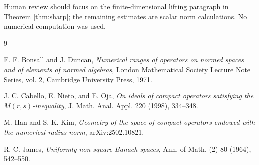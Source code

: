 \documentclass[11pt]{article}
\begin{document}
Human review should focus on the finite-dimensional lifting paragraph in
Theorem \ref{thm:sharp}; the remaining estimates are scalar norm calculations.
No numerical computation was used.

\begin{thebibliography}{9}

F. F. Bonsall and J. Duncan,
\emph{Numerical ranges of operators on normed spaces and of elements of normed algebras},
London Mathematical Society Lecture Note Series, vol. 2, Cambridge University Press, 1971.

J. C. Cabello, E. Nieto, and E. Oja,
\emph{On ideals of compact operators satisfying the \(M(r,s)\)-inequality},
J. Math. Anal. Appl. 220 (1998), 334--348.

M. Han and S. K. Kim,
\emph{Geometry of the space of compact operators endowed with the numerical radius norm},
arXiv:2502.10821.

R. C. James,
\emph{Uniformly non-square Banach spaces},
Ann. of Math. (2) 80 (1964), 542--550.

\end{thebibliography}
\end{document}
